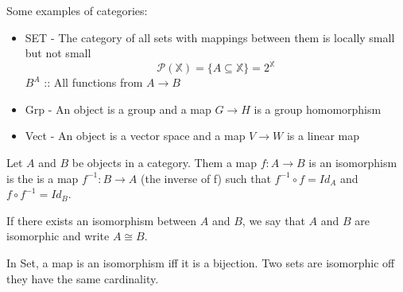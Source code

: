 Some examples of categories:
\begin{itemize}
\item SET - The category of all sets with mappings between them is locally small but not small
  $$ \mathcal{P}(\mathbb{X}) = \{A \subseteq \mathbb{X}\} = 2^{\mathbb{X}} $$
  $ B^A $ :: All functions from $A \rightarrow B $
\item Grp - An object is a group and a map $ G \rightarrow H $ is a group homomorphism
\item Vect - An object is a vector space and a map $ V \rightarrow W $ is a linear map
\end{itemize}

\begin{definition}
  Let $A$ and $B$ be objects in a category. Them a map $f : A \rightarrow B$ is an
  isomorphism is the is a map $ f^{-1}  : B \rightarrow A $ (the inverse of f) such that
  $f^{-1} \circ f = Id_A $ and $f \circ f^{-1} = Id_B$.

  If there exists an isomorphism between $A$ and $B$,
  we say that $A$ and $B$ are isomorphic and write $A \cong B$.
\end{definition}

\begin{proposition}
  In Set, a map is an isomorphism iff it is a bijection. Two sets are isomorphic
  off they have the same cardinality.
\end{proposition}

